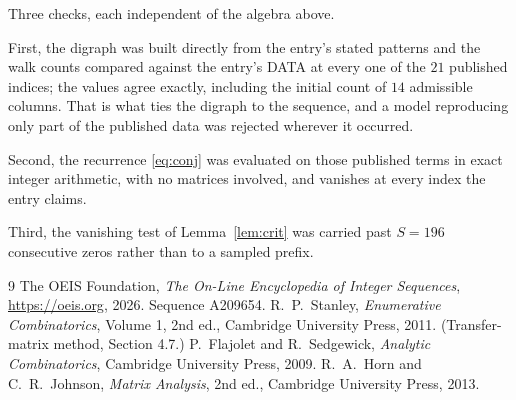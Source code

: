 \documentclass[11pt,a4paper]{article}
\theoremstyle{plain}
\theoremstyle{definition}
\begin{document}
Three checks, each independent of the algebra above.

First, the digraph was built directly from the entry's stated patterns and the walk counts
compared against the entry's DATA at every one of the $21$ published indices; the
values agree exactly, including the initial count of $14$ admissible columns. That is
what ties the digraph to the sequence, and a model reproducing only part of the published
data was rejected wherever it occurred.

Second, the recurrence \eqref{eq:conj} was evaluated on those published terms in exact
integer arithmetic, with no matrices involved, and vanishes at every index the entry claims.

Third, the vanishing test of Lemma~\ref{lem:crit} was carried past $S=196$ consecutive
zeros rather than to a sampled prefix.

\begin{thebibliography}{9}
 The OEIS Foundation, \emph{The On-Line Encyclopedia of Integer
Sequences}, \url{https://oeis.org}, 2026. Sequence A209654.
 R.~P.~Stanley, \emph{Enumerative Combinatorics}, Volume 1, 2nd ed.,
Cambridge University Press, 2011. (Transfer-matrix method, Section 4.7.)
 P.~Flajolet and R.~Sedgewick, \emph{Analytic Combinatorics}, Cambridge
University Press, 2009.
 R.~A.~Horn and C.~R.~Johnson, \emph{Matrix Analysis}, 2nd ed., Cambridge
University Press, 2013.
\end{thebibliography}
\end{document}

